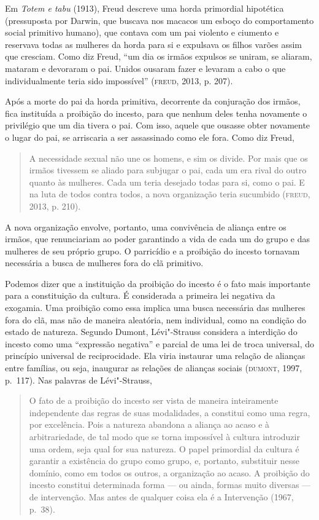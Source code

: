 Em \emph{Totem e tabu} (1913), Freud descreve uma horda primordial
hipotética (pressuposta por Darwin, que buscava nos macacos um esboço do
comportamento social primitivo humano), que contava com um pai violento
e ciumento e reservava todas as mulheres da horda para si e expulsava os
filhos varões assim que cresciam. Como diz Freud, ``um dia os irmãos
expulsos se uniram, se aliaram, mataram e devoraram o pai. Unidos
ousaram fazer e levaram a cabo o que individualmente teria sido
impossível'' (\textsc{freud}, 2013, p. 207).

Após a morte do pai da horda primitiva, decorrente da conjuração dos
irmãos, fica instituída a proibição do incesto, para que nenhum deles
tenha novamente o privilégio que um dia tivera o pai. Com isso, aquele
que ousasse obter novamente o lugar do pai, se arriscaria a ser
assassinado como ele fora. Como diz Freud,

\begin{quote}
A necessidade sexual não une os homens, e sim os divide. Por mais que os
irmãos tivessem se aliado para subjugar o pai, cada um era rival do
outro quanto às mulheres. Cada um teria desejado todas para si, como o
pai. E na luta de todos contra todos, a nova organização teria
sucumbido (\textsc{freud}, 2013, p. 210).
\end{quote}

A nova organização envolve, portanto, uma convivência de aliança entre
os irmãos, que renunciariam ao poder garantindo a vida de cada um do
grupo e das mulheres de seu próprio grupo. O parricídio e a proibição do
incesto tornavam necessária a busca de mulheres fora do clã primitivo.

Podemos dizer que a instituição da proibição do incesto é o fato mais
importante para a constituição da cultura. É considerada a primeira lei
negativa da exogamia. Uma proibição como essa implica uma busca
necessária das mulheres fora do clã, mas não de maneira aleatória, nem
individual, como na condição do estado de natureza. Segundo Dumont,
Lévi"-Strauss considera a interdição do incesto como uma ``expressão
negativa'' e parcial de uma lei de troca universal, do princípio
universal de reciprocidade. Ela viria instaurar uma relação de alianças
entre famílias, ou seja, inaugurar as relações de alianças sociais
(\textsc{dumont}, 1997, p.~117). Nas palavras de Lévi"-Strauss,

\begin{quote}
O fato de a proibição do incesto ser vista de maneira inteiramente
independente das regras de suas modalidades, a constitui como uma regra,
por excelência. Pois a natureza abandona a aliança ao acaso e à
arbitrariedade, de tal modo que se torna impossível à cultura introduzir
uma ordem, seja qual for sua natureza. O papel primordial da cultura é
garantir a existência do grupo como grupo, e, portanto, substituir nesse
domínio, como em todos os outros, a organização ao acaso. A proibição do
incesto constitui determinada forma --- ou ainda, formas muito diversas
--- de intervenção. Mas antes de qualquer coisa ela é a Intervenção
(1967, p.~38).
\end{quote}

